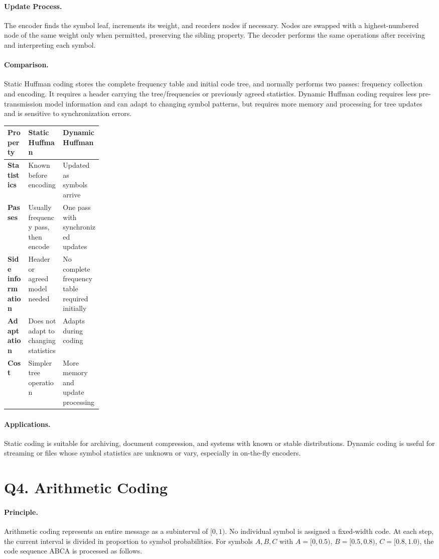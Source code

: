\documentclass[12pt,a4paper]{article}
\newcommand{\qheading}[1]{\section*{#1}}
\newcommand{\topic}[1]{\paragraph{\color{navy}#1.}}
\begin{document}
\topic{Update Process}
The encoder finds the symbol leaf, increments its weight, and reorders nodes if necessary. Nodes are swapped with a highest-numbered node of the same weight only when permitted, preserving the sibling property. The decoder performs the same operations after receiving and interpreting each symbol.

\topic{Comparison}
Static Huffman coding stores the complete frequency table and initial code tree, and normally performs two passes: frequency collection and encoding. It requires a header carrying the tree/frequencies or previously agreed statistics. Dynamic Huffman coding requires less pre-transmission model information and can adapt to changing symbol patterns, but requires more memory and processing for tree updates and is sensitive to synchronization errors.

\begin{center}
\begin{tabularx}{\linewidth}{>{\bfseries}p{0.22\linewidth}XX}
\toprule
Property & Static Huffman & Dynamic Huffman\\
\midrule
Statistics & Known before encoding & Updated as symbols arrive\\
Passes & Usually frequency pass, then encode & One pass with synchronized updates\\
Side information & Header or agreed model needed & No complete frequency table required initially\\
Adaptation & Does not adapt to changing statistics & Adapts during coding\\
Cost & Simpler tree operation & More memory and update processing\\
\bottomrule
\end{tabularx}
\end{center}

\topic{Applications}
Static coding is suitable for archiving, document compression, and systems with known or stable distributions. Dynamic coding is useful for streaming or files whose symbol statistics are unknown or vary, especially in on-the-fly encoders.

\clearpage
\qheading{Q4. Arithmetic Coding}

\topic{Principle}
Arithmetic coding represents an entire message as a subinterval of \([0,1)\). No individual symbol is assigned a fixed-width code. At each step, the current interval is divided in proportion to symbol probabilities. For symbols \(A,B,C\) with \(A=[0,0.5)\), \(B=[0.5,0.8)\), \(C=[0.8,1.0)\), the code sequence ABCA is processed as follows.
\end{document}
